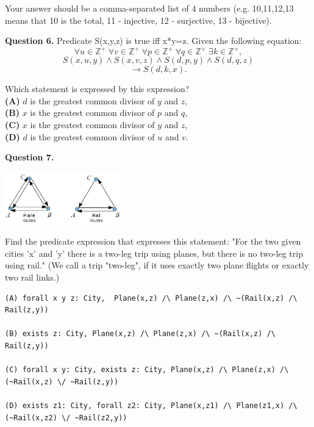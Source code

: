 \documentclass[jou]{apa6}
\begin{document}
Your answer should be a comma-separated list of 4 numbers
(e.g. 10,11,12,13 means that 10 is the total, 11 - injective, 12 - surjective, 13 - bijective).





{\bf Question 6.} 
Predicate S(x,y,z) is true iff x*y=z.
Given the following equation:
{\large
$$\forall u \in \mathbb{Z}^{+}\;\forall v \in \mathbb{Z}^{+}\;
\forall p \in \mathbb{Z}^{+}\;\forall q \in \mathbb{Z}^{+}\;
\exists k \in \mathbb{Z}^{+},$$
$$S(x,u,y) \wedge S(x,v,z) \wedge
S(d,p,y) \wedge S(d,q,z)$$
$$\rightarrow S(d,k,x).$$
}

Which statement is expressed by this expression?\\
{\bf (A)} $d$ is the greatest common divisor of $y$ and $z$,\\
{\bf (B)} $x$ is the greatest common divisor of $p$ and $q$,\\
{\bf (C)} $x$ is the greatest common divisor of $y$ and $z$,\\
{\bf (D)} $d$ is the greatest common divisor of $u$ and $v$.


{\bf Question 7.} 
\begin{center}
\includegraphics[width=2in]{relation-graphs.png}
\end{center}

Find the predicate expression that expresses this statement: 
"For the two given cities 'x' and 'y' there is a two-leg trip
using planes, but there is no two-leg trip using rail."
(We call a trip "two-leg", if it uses exactly two plane flights
or exactly two rail links.)

\begin{verbatim}
(A) forall x y z: City,  Plane(x,z) /\ Plane(z,x) /\ ~(Rail(x,z) /\ Rail(z,y))

(B) exists z: City, Plane(x,z) /\ Plane(z,x) /\ ~(Rail(x,z) /\ Rail(z,y))
	
(C) forall x y: City, exists z: City, Plane(x,z) /\ Plane(z,x) /\  (~Rail(x,z) \/ ~Rail(z,y))
	
(D) exists z1: City, forall z2: City, Plane(x,z1) /\ Plane(z1,x) /\ (~Rail(x,z2) \/ ~Rail(z2,y))
\end{verbatim}
\end{document}
